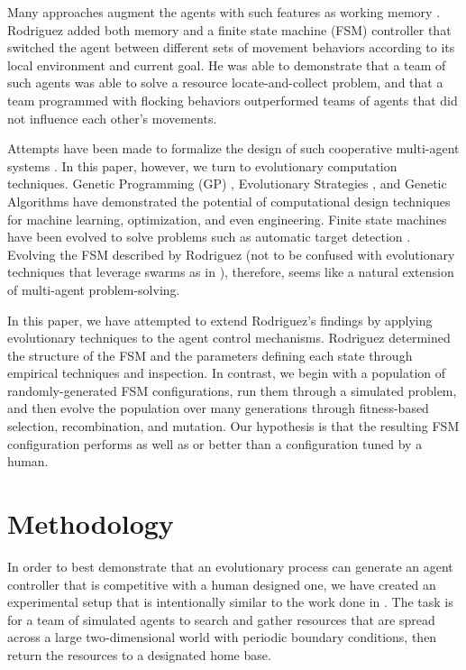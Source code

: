 \documentclass[12pt,journal,compsoc]{IEEEtran}
\begin{document}
Many approaches augment the agents with such features as working memory \cite{winder2012role,hu2003particle}. Rodriguez \cite{rodriguez2004extending} added both memory and a finite state machine (FSM) controller that switched the agent between different sets of movement behaviors according to its local environment and current goal. He was able to demonstrate that a team of such agents was able to solve a resource locate-and-collect problem, and that a team programmed with flocking behaviors outperformed teams of agents that did not influence each other's movements.

Attempts have been made to formalize the design of such cooperative multi-agent systems \cite{mataric1993designing,capera2003amas}. In this paper, however, we turn to evolutionary computation techniques. Genetic Programming (GP) \cite{koza1992genetic}, Evolutionary Strategies \cite{rechenberg1989evolution}, and Genetic Algorithms \cite{goldberg1988genetic} have demonstrated the potential of computational design techniques for machine learning, optimization, and even engineering. Finite state machines have been evolved to solve problems such as automatic target detection \cite{benson2000evolving}. Evolving the FSM described by Rodriguez (not to be confused with evolutionary techniques that leverage swarms as in \cite{wei2002swarm,miranda2005evolutionary}), therefore, seems like a natural extension of multi-agent problem-solving.

In this paper, we have attempted to extend Rodriguez's findings by applying evolutionary techniques to the agent control mechanisms. Rodriguez determined the structure of the FSM and the parameters defining each state through empirical techniques and inspection. In contrast, we begin with a population of randomly-generated FSM configurations, run them through a simulated problem, and then evolve the population over many generations through fitness-based selection, recombination, and mutation. Our hypothesis is that the resulting FSM configuration performs as well as or better than a configuration tuned by a human.

\section{Methodology}

In order to best demonstrate that an evolutionary process can generate an agent controller that is competitive with a human designed one, we have created an experimental setup that is intentionally similar to the work done in \cite{rodriguez2004extending}. The task is for a team of simulated agents to search and gather resources that are spread across a large two-dimensional world with periodic boundary conditions, then return the resources to a designated home base.
\end{document}
